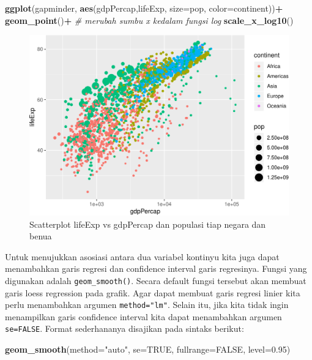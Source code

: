 \documentclass[]{book}
\newenvironment{Shaded}{\begin{snugshade}}{\end{snugshade}}
\newcommand{\KeywordTok}[1]{\textcolor[rgb]{0.13,0.29,0.53}{\textbf{#1}}}
\newcommand{\DataTypeTok}[1]{\textcolor[rgb]{0.13,0.29,0.53}{#1}}
\newcommand{\FloatTok}[1]{\textcolor[rgb]{0.00,0.00,0.81}{#1}}
\newcommand{\StringTok}[1]{\textcolor[rgb]{0.31,0.60,0.02}{#1}}
\newcommand{\CommentTok}[1]{\textcolor[rgb]{0.56,0.35,0.01}{\textit{#1}}}
\newcommand{\OtherTok}[1]{\textcolor[rgb]{0.56,0.35,0.01}{#1}}
\newcommand{\OperatorTok}[1]{\textcolor[rgb]{0.81,0.36,0.00}{\textbf{#1}}}
\newcommand{\NormalTok}[1]{#1}
\begin{document}
\begin{Shaded}
\begin{Highlighting}[]
\KeywordTok{ggplot}\NormalTok{(gapminder, }\KeywordTok{aes}\NormalTok{(gdpPercap,lifeExp, }
                      \DataTypeTok{size=}\NormalTok{pop, }\DataTypeTok{color=}\NormalTok{continent))}\OperatorTok{+}
\StringTok{  }\KeywordTok{geom_point}\NormalTok{()}\OperatorTok{+}
\StringTok{  }\CommentTok{# merubah sumbu x kedalam fungsi log}
\StringTok{  }\KeywordTok{scale_x_log10}\NormalTok{()}
\end{Highlighting}
\end{Shaded}

\begin{figure}

{\centering \includegraphics[width=0.7\linewidth]{EnvStat_files/figure-latex/ggscatter4-1} 

}

\caption{Scatterplot lifeExp vs gdpPercap dan populasi tiap negara dan benua}\label{fig:ggscatter4}
\end{figure}

Untuk menujukkan asosiasi antara dua variabel kontinyu kita juga dapat
menambahkan garis regresi dan confidence interval garis regresinya.
Fungsi yang digunakan adalah \texttt{geom\_smooth()}. Secara default
fungsi tersebut akan membuat garis loess regression pada grafik. Agar
dapat membuat garis regresi linier kita perlu menambahkan argumen
\texttt{method="lm"}. Selain itu, jika kita tidak ingin menampilkan
garis confidence interval kita dapat menambahkan argumen
\texttt{se=FALSE}. Format sederhananya disajikan pada sintaks berikut:

\begin{Shaded}
\begin{Highlighting}[]
\KeywordTok{geom_smooth}\NormalTok{(}\DataTypeTok{method=}\StringTok{"auto"}\NormalTok{, }\DataTypeTok{se=}\OtherTok{TRUE}\NormalTok{, }\DataTypeTok{fullrange=}\OtherTok{FALSE}\NormalTok{, }\DataTypeTok{level=}\FloatTok{0.95}\NormalTok{)}
\end{Highlighting}
\end{Shaded}
\end{document}
